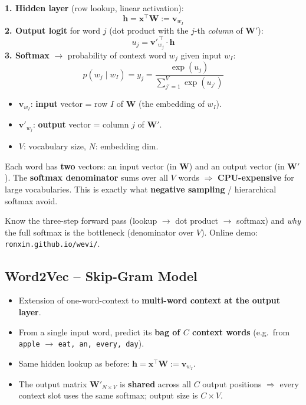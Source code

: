 \documentclass[10pt,a4paper]{article}
\begin{document}
	\begin{formulabox}
		\textbf{1. Hidden layer} (row lookup, linear activation):
		\[ \mathbf{h} = \mathbf{x}^{\top}\mathbf{W} := \mathbf{v}_{w_I} \]
		\textbf{2. Output logit} for word $j$ (dot product with the $j$-th \emph{column} of $\mathbf{W}'$):
		\[ u_j = \mathbf{v}'^{\,\top}_{w_j}\cdot \mathbf{h} \]
		\textbf{3. Softmax} $\to$ probability of context word $w_j$ given input $w_I$:
		\[ p(w_j \mid w_I) = y_j = \frac{\exp(u_j)}{\sum_{j'=1}^{V}\exp(u_{j'})} \]
		\begin{itemize}[leftmargin=1.2em]
			\item $\mathbf{v}_{w_I}$: \textbf{input} vector = row $I$ of $\mathbf{W}$ (the embedding of $w_I$).
			\item $\mathbf{v}'_{w_j}$: \textbf{output} vector = column $j$ of $\mathbf{W}'$.
			\item $V$: vocabulary size, \; $N$: embedding dim.
		\end{itemize}
	\end{formulabox}

	\begin{importantbox}
		Each word has \textbf{two} vectors: an input vector (in $\mathbf{W}$) and an output vector (in $\mathbf{W}'$). The \textbf{softmax denominator} sums over all $V$ words $\Rightarrow$ \textbf{CPU-expensive} for large vocabularies. This is exactly what \textbf{negative sampling} / hierarchical softmax avoid.
	\end{importantbox}

	\begin{examtipbox}
		Know the three-step forward pass (lookup $\to$ dot product $\to$ softmax) and \emph{why} the full softmax is the bottleneck (denominator over $V$). Online demo: \texttt{ronxin.github.io/wevi/}.
	\end{examtipbox}

	\subsection{Word2Vec -- Skip-Gram Model}

	\begin{itemize}[leftmargin=*]
		\item Extension of one-word-context to \textbf{multi-word context at the output layer}.
		\item From a single input word, predict its \textbf{bag of $C$ context words} (e.g.\ from \texttt{apple} $\to$ \texttt{eat, an, every, day}).
		\item Same hidden lookup as before: $\mathbf{h} = \mathbf{x}^{\top}\mathbf{W} := \mathbf{v}_{w_I}$.
		\item The output matrix $\mathbf{W}'_{N\times V}$ is \textbf{shared} across all $C$ output positions $\Rightarrow$ every context slot uses the same softmax; output size is $C\times V$.
	\end{itemize}
\end{document}
